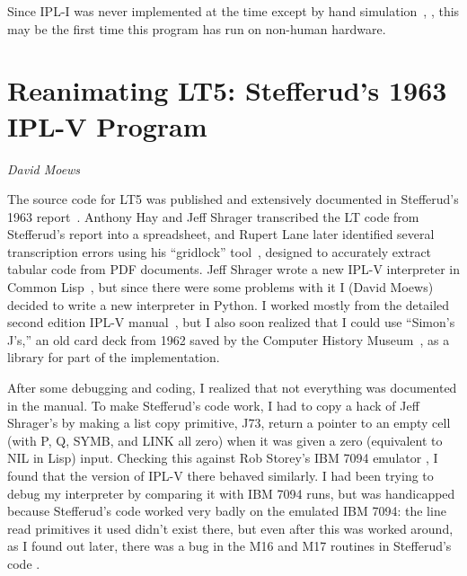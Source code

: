 \documentclass[journal]{IEEEtran}
\begin{document}
Since IPL-I was never implemented at the time except by hand
simulation~\cite[Ch.~13]{simon1996models}, \cite[p.~xx]{newell1964ipl}, this may
be the first time this program has run on non-human hardware.


%
%

\section{Reanimating LT5: Stefferud's 1963 IPL-V Program}
\label{sec:lt5}

{\em David Moews}

%
%

The source code for LT5 was published and extensively documented
in Stefferud's 1963 report~\cite{stefferud1963lt}.  
Anthony Hay and Jeff Shrager transcribed the LT code from Stefferud's
report into a spreadsheet, and Rupert Lane later identified
several transcription errors using his ``gridlock''
tool~\cite{lane2024gridlock}, designed to accurately extract
tabular code from PDF documents.
Jeff Shrager wrote a new IPL-V interpreter in Common 
Lisp~\cite{shrager2026,shragerrepo}, but since there were some problems with
it I (David Moews) decided to write a new interpreter in Python.
I worked mostly from the detailed second edition IPL-V
manual~\cite{newell1964ipl}, but I also soon realized that I could use
``Simon's J's,'' an old card deck from 1962 saved by the Computer History
Museum~\cite{bochannek2012simonsjs}, as a library for part of the
implementation.

After some debugging and coding, I realized that not
everything was documented in the manual.
To make Stefferud's code work, I had to copy a hack of Jeff 
Shrager's by making a list copy primitive, J73, return a pointer
to an empty cell (with P, Q, SYMB, and LINK all zero) when it was given
a zero (equivalent to NIL in Lisp) input.  Checking this against Rob 
Storey's IBM 7094 emulator \cite{ibsys}, I found that the version of IPL-V there
behaved similarly.  I had been trying to debug my interpreter by comparing
it with IBM 7094 runs, but was handicapped because Stefferud's code
worked very badly on the emulated IBM 7094: the line read primitives
it used didn't exist there, but even after this was worked around,
as I found out later, there was a bug in the M16 and M17 routines
in Stefferud's code \cite{moewsrepo2}.
\end{document}
